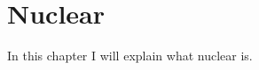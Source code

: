 \setchapterpreamble[u]{\margintoc}
\chapter{Nuclear}

In this chapter I will explain what nuclear is.